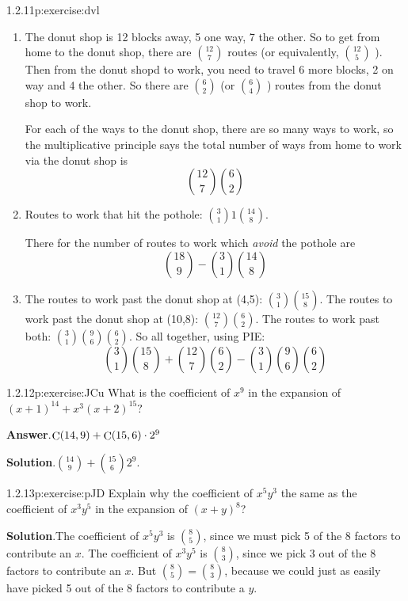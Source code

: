 \documentclass[twoside,11pt,]{book}
\newcommand{\blocktitlefont}{\relax}
\numberwithin{equation}{chapter}
\begin{document}
\begin{divisionsolution}{1.2.11}{}{p:exercise:dvl}
\begin{enumerate}[label=(\alph*)]
\item{}The donut shop is 12 blocks away, 5 one way, 7 the other. So to get from home to the donut shop, there are \({12 \choose 7}\) routes (or equivalently, \({12 \choose 5}\) ). Then from the donut shopd to work, you need to travel 6 more blocks, 2 on way and 4 the other. So there are \({6 \choose 2}\) (or \({6 \choose 4}\) ) routes from the donut shop to work.%
\par
For each of the ways to the donut shop, there are so many ways to work, so the multiplicative principle says the total number of ways from home to work via the donut shop is%
\begin{equation*}
\binom{12}{7}\binom{6}{2}
\end{equation*}
%
\item{}Routes to work that hit the pothole: \({3 \choose 1}1{14 \choose 8}\).%
\par
There for the number of routes to work which \emph{avoid} the pothole are%
\begin{equation*}
{18 \choose 9} - {3 \choose 1}{14 \choose 8}
\end{equation*}
%
\item{}The routes to work past the donut shop at (4,5): \({3\choose 1}{15 \choose 8}\). The routes to work past the donut shop at (10,8): \({12 \choose 7}{6 \choose 2}\). The routes to work past both: \({3\choose 1}{9 \choose 6}{6 \choose 2}\). So all together, using PIE:%
\begin{equation*}
{3\choose 1}{15 \choose 8} + {12 \choose 7}{6 \choose 2} - {3\choose 1}{9 \choose 6}{6 \choose 2}
\end{equation*}
%
\end{enumerate}
%
\end{divisionsolution}%
\begin{divisionsolution}{1.2.12}{}{p:exercise:JCu}%
What is the coefficient of \(x^9\) in the expansion of \((x+1)^{14} + x^3(x+2)^{15}\text{?}\)%
\par\smallskip%
\noindent\textbf{\blocktitlefont Answer}.\quad{}\(\mathop{\rm C}\nolimits\!\left(14,9\right)+\mathop{\rm C}\nolimits\!\left(15,6\right)\cdot 2^{9}\)%
\par\smallskip%
\noindent\textbf{\blocktitlefont Solution}.\quad{}\({14\choose 9} + {15 \choose 6}2^9\text{.}\)%
\end{divisionsolution}%
\begin{divisionsolution}{1.2.13}{}{p:exercise:pJD}%
Explain why the coefficient of \(x^5y^3\) the same as the coefficient of \(x^3y^5\) in the expansion of \((x+y)^8\)?%
\par\smallskip%
\noindent\textbf{\blocktitlefont Solution}.\quad{}The coefficient of \(x^5y^3\) is \({8\choose 5}\), since we must pick 5 of the 8 factors to contribute an \(x\). The coefficient of \(x^3y^5\) is \({8 \choose 3}\), since we pick 3 out of the 8 factors to contribute an \(x\). But \({8 \choose 5} = {8\choose 3}\), because we could just as easily have picked 5 out of the 8 factors to contribute a \(y\).%
\end{divisionsolution}%
\end{document}
